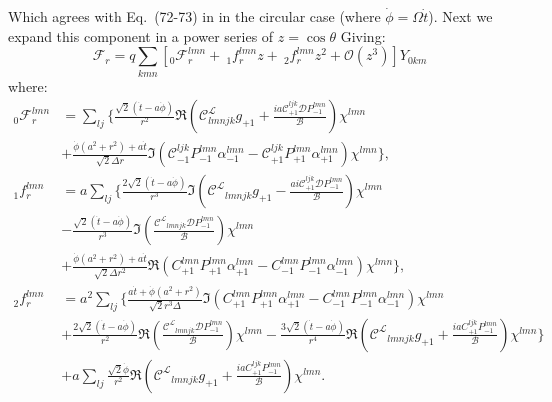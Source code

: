 \documentclass[preprint,showpacs,preprintnumbers,amssymb,superscriptaddress,aps,prd,nofootinbib,11pt]{revtex4-1}
\begin{document}
Which agrees with Eq.~(72-73) in \cite{TorresDolan2022} in the circular case (where $\dot{\phi} = \Omega \dot{t}$). Next we expand this component in a power series of $z=\cos\theta$ Giving:
\begin{equation}
    \mathcal{F}_r = q \sum\limits_{kmn} \left[ {}_0\mathcal{F}_r^{lmn} +\  {}_1f_r^{lmn} z +\  {}_2f_r^{lmn} z^2+ \mathcal{O}(z^3) \right]Y_{0km}
\end{equation}
where:
\begin{align}
   \nonumber {}_0\mathcal{F}_r^{lmn} &= \sum\limits_{lj} \Bigg\{\frac{\sqrt{2} (\dot{t} - a \dot{\phi})}{r^2} \Re{\left(\mathcal{C}^\mathcal{L}_{lmnjk}g_{+1} + \frac{i a \mathcal{C}_{+1}^{ljk} \mathcal{D} P_{-1}^{lmn}}{\mathcal{B}}\right)\chi^{lmn}} \\&+ \frac{\dot{\phi} (a^2 + r^2) + a \dot{t}}{\sqrt{2}\Delta r} \Im{\left(\mathcal{C}_{-1}^{ljk}P_{-1}^{lmn}\alpha_{-1}^{lmn} - \mathcal{C}_{+1}^{ljk} P_{+1}^{lmn} \alpha_{+1}^{lmn}\right)\chi^{lmn}}\Bigg\},\\
   \nonumber {}_1f_r^{lmn} &= a  \sum\limits_{lj} \Bigg\{\frac{2 \sqrt{2} (\dot{t} - a \dot{\phi})}{r^3} \Im{\left(\mathcal{C^L}_{lmnjk} g_{+1} - \frac{ai\mathcal{C}_{+1}^{ljk}\mathcal{D}P_{-1}^{lmn}}{\mathcal{B}}\right)\chi^{lmn}}\\
   \nonumber&- \frac{\sqrt{2} (\dot{t}-a\dot{\phi})}{r^3} \Im{\left(\frac{\mathcal{C^L}_{lmnjk}\mathcal{D}P_{-1}^{lmn}}{\mathcal{B}}\right) \chi^{lmn}} \\ &+ \frac{\dot{\phi} (a^2 +r^2) + a \dot{t}}{\sqrt{2} \Delta r^2} \Re{\left(C_{+1}^{lmn} P_{+1}^{lmn} \alpha_{+1}^{lmn} - C_{-1}^{lmn} P_{-1}^{lmn} \alpha_{-1}^{lmn}\right)\chi^{lmn}}\Bigg\},\\
   \nonumber {}_2f_r^{lmn} &= a^2 \sum\limits_{lj}\Bigg \{ \frac{a \dot{t} + \dot{\phi} (a^2 + r^2)}{\sqrt{2} r^3 \Delta} \Im{\left(C_{+1}^{lmn} P_{+1}^{lmn} \alpha_{+1}^{lmn} - C_{-1}^{lmn} P_{-1}^{lmn} \alpha_{-1}^{lmn}\right)\chi^{lmn}}\\ 
   \nonumber &+ \frac{2 \sqrt{2} (\dot{t} -a \dot{\phi})}{r^2} \Re{\left(\frac{\mathcal{C^L}_{lmnjk} \mathcal{D}P_{-1}^{lmn}}{\mathcal{B}}\right)\chi^{lmn}} - \frac{3 \sqrt{2} (\dot{t} -a \dot{\phi})}{r^4} \Re{\left(\mathcal{C^L}_{lmnjk} g_{+1} + \frac{i a C_{+1}^{ljk}P_{-1}^{lmn}}{\mathcal{B}}\right)\chi^{lmn}} \Bigg\}\\
   &+ a \sum\limits_{lj} \frac{\sqrt{2} \dot{\phi}}{r^2} \Re{\left(\mathcal{C^L}_{lmnjk} g_{+1} + \frac{i a C_{+1}^{ljk}P_{-1}^{lmn}}{\mathcal{B}}\right)\chi^{lmn}}.
\end{align}
\newpage
\appendix
\end{document}
